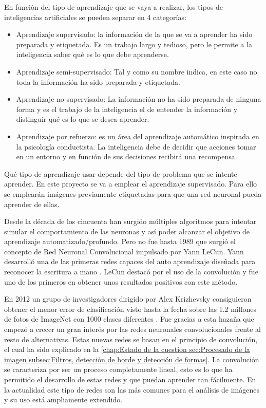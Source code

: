 En función del tipo de aprendizaje que se vaya a realizar, los tipos de inteligencias artificiales se pueden separar en 4 categorías:

\begin{itemize}
\item Aprendizaje supervisado: la información de la que se va a aprender ha sido preparada y etiquetada. Es un trabajo largo y tedioso, pero le permite a la inteligencia saber qué es lo que debe aprenderse.
\item Aprendizaje semi-supervisado: Tal y como su nombre indica, en este caso no toda la información ha sido preparada y etiquetada. 
\item Aprendizaje no supervisado: La información no ha sido preparada de ninguna forma y es el trabajo de la inteligencia el de entender la información y distinguir qué es lo que se desea aprender.
\item Aprendizaje por refuerzo: es un área del aprendizaje automático inspirada en la psicología conductista. La inteligencia debe de decidir que acciones tomar en un entorno y en función de sus decisiones recibirá una recompensa.
\end{itemize}

Qué tipo de aprendizaje usar depende del tipo de problema que se intente aprender. En este proyecto se va a emplear el aprendizaje supervisado. Para ello se emplearán imágenes previamente etiquetadas para que una red neuronal pueda aprender de ellas.

Desde la década de los cincuenta han surgido múltiples algoritmos para intentar simular el comportamiento de las neuronas y así poder alcanzar el objetivo de aprendizaje automatizado/profundo. Pero no fue hasta 1989 que surgió el concepto de Red Neuronal Convolucional impulsado por Yann LeCun. Yann desarrolló una de las primeras redes capaces del auto aprendizaje diseñada para reconocer la escritura a mano \cite{LeCun}. LeCun destacó por el uso de la convolución y fue uno de los primeros en obtener unos resultados positivos con este método.

En 2012 un grupo de investigadores dirigido por Alex Krizhevsky consiguieron obtener el menor error de clasificación visto hasta la fecha sobre las 1.2 millones de fotos de ImageNet con 1000 clases diferentes \cite{AlexNet}. Fue gracias a esta hazaña que empezó a crecer un gran interés por las redes neuronales convolucionales frente al resto de alternativas. Estas nuevas redes se basan en el principio de convolución, el cual ha sido explicado en la \autoref{chap:Estado de la cuestion sec:Procesado de la imagen subsec:Filtros, detección de borde y detección de formas}. La convolución se caracteriza por ser un proceso completamente lineal, esto es lo que ha permitido el desarrollo de estas redes y que puedan aprender tan fácilmente. En la actualidad este tipo de redes son las más comunes para el análisis de imágenes y su uso está ampliamente extendido.

